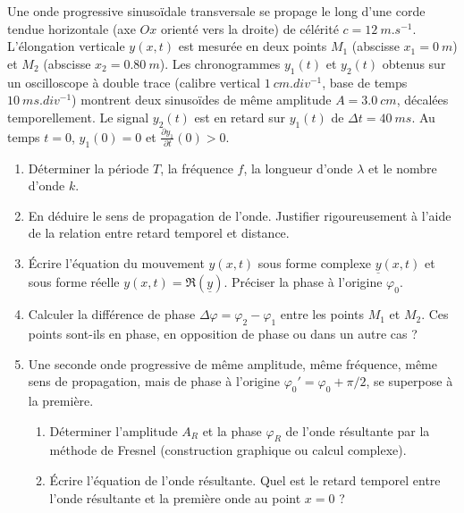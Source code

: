 \documentclass[11pt]{article}
\begin{document}
\begin{exercice}
Une onde progressive sinusoïdale transversale se propage le long d'une corde tendue horizontale (axe $Ox$ orienté vers la droite) de célérité $c = \SI{12}{m.s^{-1}}$. L'élongation verticale $y(x,t)$ est mesurée en deux points $M_1$ (abscisse $x_1 = \SI{0}{m}$) et $M_2$ (abscisse $x_2 = \SI{0,80}{m}$). Les chronogrammes $y_1(t)$ et $y_2(t)$ obtenus sur un oscilloscope à double trace (calibre vertical $\SI{1}{cm.div^{-1}}$, base de temps $\SI{10}{ms.div^{-1}}$) montrent deux sinusoïdes de même amplitude $A = \SI{3,0}{cm}$, décalées temporellement. Le signal $y_2(t)$ est en retard sur $y_1(t)$ de $\Delta t = \SI{40}{ms}$. Au temps $t=0$, $y_1(0) = 0$ et $\frac{\partial y_1}{\partial t}(0) > 0$.
\begin{enumerate}
    \item Déterminer la période $T$, la fréquence $f$, la longueur d'onde $\lambda$ et le nombre d'onde $k$.
    \item En déduire le sens de propagation de l'onde. Justifier rigoureusement à l'aide de la relation entre retard temporel et distance.
    \item Écrire l'équation du mouvement $y(x,t)$ sous forme complexe $\underline{y}(x,t)$ et sous forme réelle $y(x,t) = \Re(\underline{y})$. Préciser la phase à l'origine $\varphi_0$.
    \item Calculer la différence de phase $\Delta \varphi = \varphi_2 - \varphi_1$ entre les points $M_1$ et $M_2$. Ces points sont-ils en phase, en opposition de phase ou dans un autre cas ? 
    \item Une seconde onde progressive de même amplitude, même fréquence, même sens de propagation, mais de phase à l'origine $\varphi_0' = \varphi_0 + \pi/2$, se superpose à la première. 
    \begin{enumerate}
        \item Déterminer l'amplitude $A_R$ et la phase $\varphi_R$ de l'onde résultante par la méthode de Fresnel (construction graphique ou calcul complexe).
        \item Écrire l'équation de l'onde résultante. Quel est le retard temporel entre l'onde résultante et la première onde au point $x=0$ ?
    \end{enumerate}
\end{enumerate}
\end{exercice}
\end{document}

